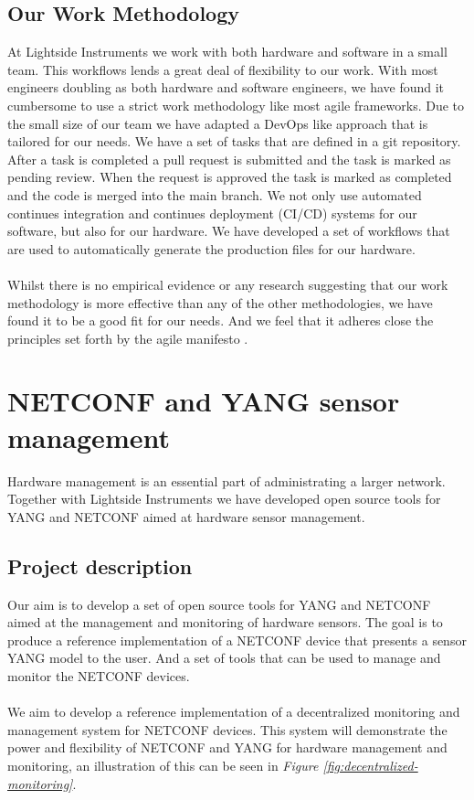 \documentclass[12pt]{article}
\begin{document}
\subsection{Our Work Methodology}
At Lightside Instruments we work with both hardware and software in a small team. 
This workflows lends a great deal of flexibility to our work.
With most engineers doubling as both hardware and software engineers, we have found it cumbersome to use a strict work methodology like most agile frameworks.
Due to the small size of our team we have adapted a DevOps like approach that is tailored for our needs. 
We have a set of tasks that are defined in a git repository. After a task is completed a pull request is submitted and the task
is marked as pending review. When the request is approved the task is marked as completed and the code is merged into the main branch.
We not only use automated continues integration and continues deployment (CI/CD) systems for our software, but also for our hardware.
We have developed a set of workflows that are used to automatically generate the production files for our hardware. 
\\
\\
Whilst there is no empirical evidence or any research suggesting that our work methodology is more effective than any of the other methodologies, 
we have found it to be a good fit for our needs. And we feel that it adheres close the principles set forth by the agile manifesto 
\cite{ManifestoAgileSoftware}.

\section{NETCONF and YANG sensor management}

Hardware management is an essential part of administrating a larger network. Together with Lightside Instruments we have 
developed open source tools for YANG and NETCONF aimed at hardware sensor management.

\subsection{Project description}
Our aim is to develop a set of open source tools for YANG and NETCONF aimed at the management and monitoring of hardware sensors.
The goal is to produce a reference implementation of a NETCONF device that presents a sensor YANG model to the user.
And a set of tools that can be used to manage and monitor the NETCONF devices. 
\\
\\
We aim to develop a reference implementation of a decentralized monitoring and management system for NETCONF devices.
This system will demonstrate the power and flexibility of NETCONF and YANG for hardware management and monitoring, an 
illustration of this can be seen in \textit{Figure \ref{fig:decentralized-monitoring}}.
\end{document}
